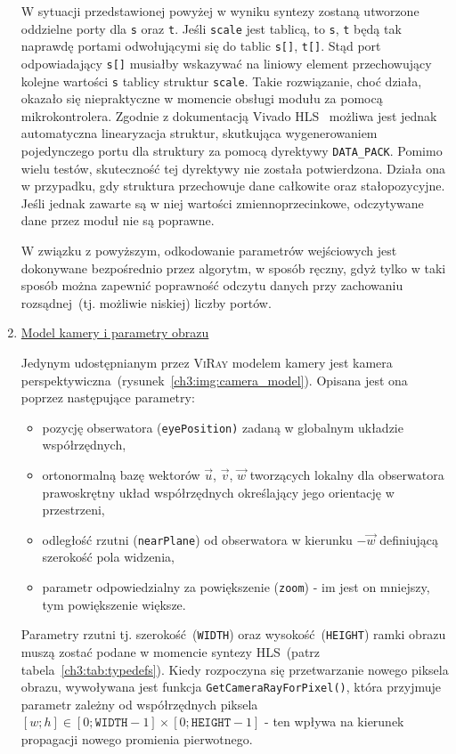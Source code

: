 \begin{enumerate}
W sytuacji przedstawionej powyżej w wyniku syntezy zostaną utworzone oddzielne porty dla \texttt{s} oraz \texttt{t}. Jeśli \texttt{scale} jest tablicą, to \texttt{s}, \texttt{t} będą tak naprawdę portami odwołującymi się do tablic \texttt{s[]}, \texttt{t[]}. Stąd port odpowiadający \texttt{s[]} musiałby wskazywać na liniowy element przechowujący kolejne wartości \texttt{s} tablicy struktur \texttt{scale}. Takie rozwiązanie, choć działa, okazało się niepraktyczne w momencie obsługi modułu za pomocą mikrokontrolera. Zgodnie z dokumentacją Vivado HLS~\cite{UG902} możliwa jest jednak automatyczna linearyzacja struktur, skutkująca wygenerowaniem pojedynczego portu dla struktury za pomocą dyrektywy \texttt{DATA\_PACK}. Pomimo wielu testów, skuteczność tej dyrektywy nie została potwierdzona. Działa ona w przypadku, gdy struktura przechowuje dane całkowite oraz stałopozycyjne. Jeśli jednak zawarte są w niej wartości zmiennoprzecinkowe, odczytywane dane przez moduł nie są poprawne. 

W związku z powyższym, odkodowanie parametrów wejściowych jest dokonywane bezpośrednio przez algorytm, w sposób ręczny, gdyż tylko w taki sposób można zapewnić poprawność odczytu danych przy zachowaniu rozsądnej~(tj. możliwie niskiej) liczby portów.


\item \underline{Model kamery i parametry obrazu}

Jedynym udostępnianym przez \textsc{ViRay} modelem kamery jest kamera perspektywiczna~(rysunek~\ref{ch3:img:camera_model}). Opisana jest ona poprzez następujące parametry:
\begin{itemize}
\item pozycję obserwatora (\texttt{eyePosition)} zadaną w globalnym układzie współrzędnych,
\item ortonormalną bazę wektorów $\vec{u}$, $\vec{v}$, $\vec{w}$ tworzących lokalny dla obserwatora prawoskrętny układ współrzędnych określający jego orientację w przestrzeni,
\item odległość rzutni (\texttt{nearPlane}) od obserwatora w kierunku $-\vec{w}$ definiującą szerokość pola widzenia,
\item parametr odpowiedzialny za powiększenie (\texttt{zoom}) - im jest on mniejszy, tym powiększenie większe.
\end{itemize}
Parametry rzutni tj. szerokość~(\texttt{WIDTH}) oraz wysokość~(\texttt{HEIGHT}) ramki obrazu muszą zostać podane w momencie syntezy HLS~(patrz tabela~\ref{ch3:tab:typedefs}). Kiedy rozpoczyna się przetwarzanie nowego piksela obrazu, wywoływana jest funkcja \texttt{GetCameraRayForPixel()}, która przyjmuje parametr zależny od współrzędnych piksela $[w; h] \in [0; \mathtt{WIDTH} - 1]\times[0; \mathtt{HEIGHT} - 1]$ - ten wpływa na kierunek propagacji nowego promienia pierwotnego.


\end{enumerate}
